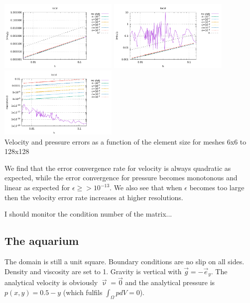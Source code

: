 \begin{center}
\includegraphics[width=5.7cm]{python_codes/fieldstone_115/results/dh/errorsV_local.pdf}
\includegraphics[width=5.7cm]{python_codes/fieldstone_115/results/dh/errorsP_local.pdf}
\includegraphics[width=5.7cm]{python_codes/fieldstone_115/results/dh/divv_local.pdf}\\
{\captionfont Velocity and pressure errors as a function of the element size for meshes 6x6 to 128x128}
\end{center}
We find that the error convergence rate for velocity is always quadratic as expected, 
while the error convergence for pressure becomes monotonous and linear as expected for $\epsilon\ge >10^{-13}$.
We also see that when $\epsilon$ becomes too large then the velocity error rate increases at higher resolutions.


I should monitor the condition number of the matrix...

\newpage
\subsection*{The aquarium}

The domain is still a unit square. Boundary conditions are no slip on all sides. 
Density and viscosity are set to 1. Gravity is vertical with $\vec{g}=-\vec{e}_y$.
The analytical velocity is obviously $\vec\upnu=\vec{0}$ and the analytical pressure
is $p(x,y)=0.5-y$ (which fulfils $\int_\Omega p dV=0$).

